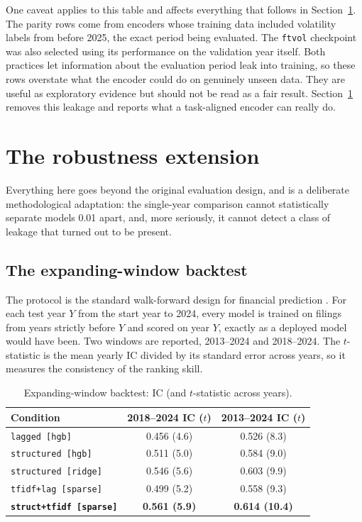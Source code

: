 \documentclass[logo,msc,ai]{infthesis}        %
\begin{document}
One caveat applies to this table and affects everything that follows in Section~\ref{sec:results-robust}. The parity rows come from encoders whose training data included volatility labels from before 2025, the exact period being evaluated. The \texttt{ftvol} checkpoint was also selected using its performance on the validation year itself. Both practices let information about the evaluation period leak into training, so these rows overstate what the encoder could do on genuinely unseen data. They are useful as exploratory evidence but should not be read as a fair result. Section~\ref{sec:results-robust} removes this leakage and reports what a task-aligned encoder can really do.

\section{The robustness extension}
\label{sec:results-robust}
Everything here goes beyond the original evaluation design, and is a deliberate methodological adaptation: the single-year comparison cannot statistically separate models 0.01 apart, and, more seriously, it cannot detect a class of leakage that turned out to be present.

\subsection{The expanding-window backtest}
The protocol is the standard walk-forward design for financial prediction \cite{de2018advances}. For each test year $Y$ from the start year to 2024, every model is trained on filings from years strictly before $Y$ and scored on year $Y$, exactly as a deployed model would have been. Two windows are reported, 2013--2024 and 2018--2024. The $t$-statistic is the mean yearly IC divided by its standard error across years, so it measures the consistency of the ranking skill.

\begin{table}[h]
\centering
\footnotesize
\caption{Expanding-window backtest: IC (and $t$-statistic across years).}
\label{tab:backtest}
\begin{tabular}{@{}L{5.2cm}cc@{}}
\toprule
\textbf{Condition} & \textbf{2018--2024 IC ($t$)} & \textbf{2013--2024 IC ($t$)} \\
\midrule
\texttt{lagged [hgb]}            & 0.456 (4.6) & 0.526 (8.3) \\
\texttt{structured [hgb]}        & 0.511 (5.0) & 0.584 (9.0) \\
\texttt{structured [ridge]}      & 0.546 (5.6) & 0.603 (9.9) \\
\texttt{tfidf+lag [sparse]}      & 0.499 (5.2) & 0.558 (9.3) \\
\textbf{\texttt{struct+tfidf [sparse]}} & \textbf{0.561 (5.9)} & \textbf{0.614 (10.4)} \\
\bottomrule
\end{tabular}
\end{table}
\end{document}
